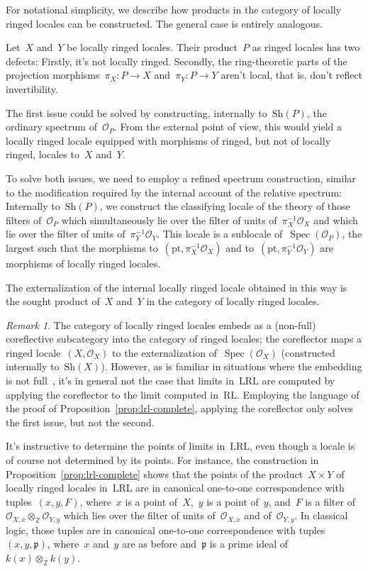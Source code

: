 \documentclass[10pt,reqno,a4paper]{amsbook}
\makeatletter
\theoremstyle{definition}
\theoremstyle{plain}
\theoremstyle{remark}
\newtheorem{rem}[defn]{Remark}
\newcommand{\ZZ}{\mathbb{Z}}
\renewcommand{\O}{\mathcal{O}}
\newcommand{\ppp}{\mathfrak{p}}
\newcommand{\Sh}{\mathrm{Sh}}
\newcommand{\RL}{\mathrm{RL}}
\newcommand{\LRL}{\mathrm{LRL}}
\newcommand{\pt}{\mathrm{pt}}
\DeclareMathOperator{\Spec}{Spec}
\newcommand{\?}{\,{:}\,}
\renewcommand{\_}{\mathpunct{.}\,}
\renewenvironment{proof}[1][\proofname]{\par
  \pushQED{\qed}%
  \normalfont \topsep6\p@\@plus6\p@\relax
  \trivlist
  \item[\hskip\labelsep
        \itshape
    #1\@addpunct{.}]\ignorespaces
}{%
  \popQED\endtrivlist\@endpefalse
}
\makeatother
\begin{document}
\begin{proof}For notational simplicity, we describe how products in the
category of locally ringed locales can be constructed. The general case is
entirely analogous.

Let~$X$ and~$Y$ be locally ringed locales. Their product~$P$ as ringed locales has
two defects: Firstly, it's not locally ringed. Secondly, the ring-theoretic
parts of the projection morphisms~$\pi_X : P \to X$ and~$\pi_Y : P \to Y$
aren't local, that is, don't reflect invertibility.

The first issue could be solved by constructing, internally to~$\Sh(P)$, the
ordinary spectrum of~$\O_P$. From the external point of view, this would yield
a locally ringed locale equipped with morphisms of ringed, but not of locally
ringed, locales to~$X$ and~$Y$.

To solve both issues, we need to employ a refined spectrum construction,
similar to the modification required by the internal account of the relative
spectrum: Internally to~$\Sh(P)$, we construct the classifying locale of the
theory of those filters of~$\O_P$ which simultaneously lie over the filter of
units of~$\pi_X^{-1}\O_X$ and which lie over the filter of units
of~$\pi_Y^{-1}\O_Y$. This locale is a sublocale of~$\Spec(\O_P)$, the largest
such that the morphisms to~$(\pt,\pi_X^{-1}\O_X)$ and to~$(\pt,\pi_Y^{-1}\O_Y)$ are
morphisms of locally ringed locales.

The externalization of the internal locally ringed locale obtained in this way
is the sought product of~$X$ and~$Y$ in the category of locally ringed locales.
\end{proof}

\begin{rem}The category of locally ringed locales embeds as a (non-full)
coreflective subcategory into the category of ringed locales; the coreflector
maps a ringed locale~$(X,\O_X)$ to the externalization of~$\Spec(\O_X)$
(constructed internally to~$\Sh(X)$). However, as is familiar in situations where the embedding
is not full~\cite{adamek:rosicky:reflective}, it's in general not the case that limits in~$\LRL$ are computed by
applying the coreflector to the limit computed in~$\RL$. Employing the language
of the proof of Proposition~\ref{prop:lrl-complete}, applying the coreflector only
solves the first issue, but not the second.
\end{rem}

It's instructive to determine the points of limits in~$\LRL$, even though a
locale is of course not determined by its points. For instance, the construction in
Proposition~\ref{prop:lrl-complete} shows that the points of the product~$X
\times Y$ of locally ringed locales in~$\LRL$ are in canonical one-to-one
correspondence with tuples~$(x,y,F)$, where~$x$ is a point of~$X$,~$y$ is a
point of~$y$, and~$F$ is a filter of~$\O_{X,x} \otimes_\ZZ \O_{Y,y}$ which lies
over the filter of units of~$\O_{X,x}$ and of~$\O_{Y,y}$. In classical logic,
those tuples are in canonical one-to-one correspondence with
tuples~$(x,y,\ppp)$, where~$x$ and~$y$ are as before and~$\ppp$ is a prime
ideal of~$k(x) \otimes_\ZZ k(y)$.
\end{document}
